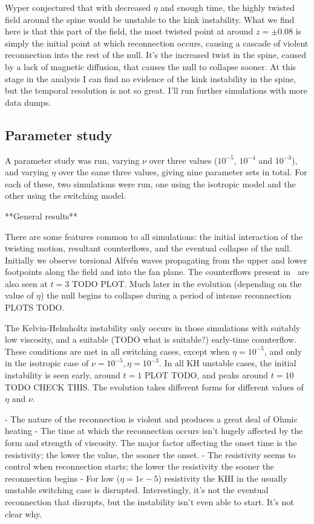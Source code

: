 Wyper conjectured that with decreased $\eta$ and enough time, the highly twisted field around the spine would be unstable to the kink instability. What we find here is that this part of the field, the most twisted point at around $z=\pm 0.08$ is simply the initial point at which reconnection occurs, causing a cascade of violent reconnection into the rest of the null. It's the increased twist in the spine, caused by a lack of magnetic diffusion, that causes the null to collapse sooner. At this stage in the analysis I can find no evidence of the kink instability in the spine, but the temporal resolution is not so great. I'll run further simulations with more data dumps.

\subsection{Parameter study}

A parameter study was run, varying $\nu$ over three values ($10^{-5}$, $10^{-4}$ and $10^{-3}$), and varying $\eta$ over the same three values, giving nine parameter sets in total. For each of these, two simulations were run, one using the isotropic model and the other using the switching model.

**General results**

There are some features common to all simulations: the initial interaction of the twisting motion, resultant counterflows, and the eventual collapse of the null. Initially we observe torsional Alfv\'en waves propagating from the upper and lower footpoints along the field and into the fan plane. The counterflows present in~\cite{wyperKelvinHelmholtzInstabilityCurrentvortex2013} are also seen at $t=3$ TODO PLOT. Much later in the evolution (depending on the value of $\eta$) the null begins to collapse during a period of intense reconnection PLOTS TODO.

The Kelvin-Helmholtz instability only occurs in those simulations with suitably low viscosity, and a suitable (TODO what is suitable?) early-time counterflow. These conditions are met in all switching cases, except when $\eta=10^{-5}$, and only in the isotropic case of $\nu = 10^{-5}, \eta=10^{-3}$. In all KH unstable cases, the initial instability is seen early, around $t=1$ PLOT TODO, and peaks around $t=10$ TODO CHECK THIS. The evolution takes different forms for different values of $\eta$ and $\nu$.

- The nature of the reconnection is violent and produces a great deal of Ohmic heating
- The time at which the reconnection occurs isn't hugely affected by the form and strength of viscosity. The major factor affecting the onset time is the resistivity; the lower the value, the sooner the onset.
- The resistivity seems to control when reconnection starts; the lower the resistivity the sooner the reconnection begins
- For low ($\eta=1e-5$) resistivity the KHI in the usually unstable switching case is disrupted. Interestingly, it's not the eventual reconnection that disrupts, but the instability isn't even able to start. It's not clear why.
